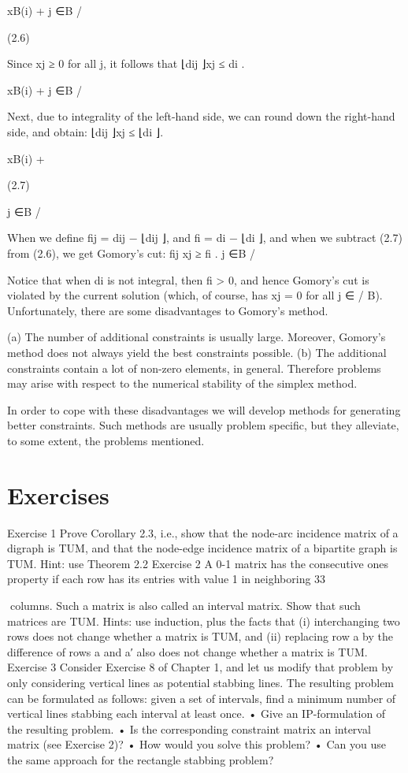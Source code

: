 \documentclass[titlepage]{book}
\theoremstyle{plain}
\theoremstyle{definition}
\theoremstyle{remark}
\begin{document}
xB(i) +
j ∈B
/

(2.6)

Since xj ≥ 0 for all j, it follows that
⌊dij ⌋xj ≤ di .

xB(i) +
j ∈B
/

Next, due to integrality of the left-hand side, we can round down the right-hand side, and obtain:
⌊dij ⌋xj ≤ ⌊di ⌋.

xB(i) +

(2.7)

j ∈B
/

When we define fij = dij − ⌊dij ⌋, and fi = di − ⌊di ⌋, and when we subtract (2.7) from (2.6), we get
Gomory's cut:
fij xj ≥ fi .
j ∈B
/

Notice that when di is not integral, then fi > 0, and hence Gomory's cut is violated by the current
solution (which, of course, has xj = 0 for all j ∈
/ B).
Unfortunately, there are some disadvantages to Gomory's method.

(a) The number of additional constraints is usually large. Moreover, Gomory's method does not always
yield the best constraints possible.
(b) The additional constraints contain a lot of non-zero elements, in general. Therefore problems may
arise with respect to the numerical stability of the simplex method.

In order to cope with these disadvantages we will develop methods for generating better constraints. Such
methods are usually problem specific, but they alleviate, to some extent, the problems mentioned.

\section*{Exercises}
Exercise 1
Prove Corollary 2.3, i.e., show that the node-arc incidence matrix of a digraph is TUM, and that the
node-edge incidence matrix of a bipartite graph is TUM. Hint: use Theorem 2.2
Exercise 2
A 0-1 matrix has the consecutive ones property if each row has its entries with value 1 in neighboring
33

columns. Such a matrix is also called an interval matrix. Show that such matrices are TUM. Hints: use
induction, plus the facts that (i) interchanging two rows does not change whether a matrix is TUM, and
(ii) replacing row a by the difference of rows a and a′ also does not change whether a matrix is TUM.
Exercise 3
Consider Exercise 8 of Chapter 1, and let us modify that problem by only considering vertical lines as
potential stabbing lines. The resulting problem can be formulated as follows: given a set of intervals,
find a minimum number of vertical lines stabbing each interval at least once.
• Give an IP-formulation of the resulting problem.
• Is the corresponding constraint matrix an interval matrix (see Exercise 2)?
• How would you solve this problem?
• Can you use the same approach for the rectangle stabbing problem?
\end{document}
